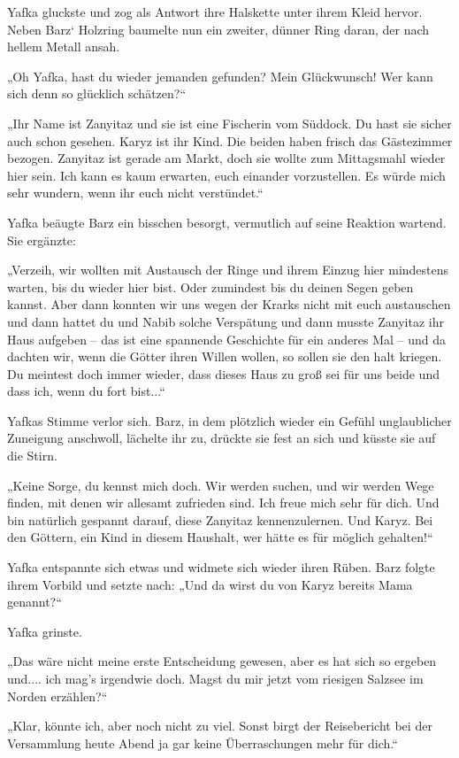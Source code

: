 Yafka gluckste und zog als Antwort ihre Halskette unter ihrem Kleid hervor. Neben Barz‘ Holzring baumelte nun ein zweiter, dünner Ring daran, der nach hellem Metall ansah.

„Oh Yafka, hast du wieder jemanden gefunden? Mein Glückwunsch! Wer kann sich denn so glücklich schätzen?“

„Ihr Name ist Zanyitaz und sie ist eine Fischerin vom Süddock. Du hast sie sicher auch schon gesehen. Karyz ist ihr Kind. Die beiden haben frisch das Gästezimmer bezogen. Zanyitaz ist gerade am Markt, doch sie wollte zum Mittagsmahl wieder hier sein. Ich kann es kaum erwarten, euch einander vorzustellen. Es würde mich sehr wundern, wenn ihr euch nicht verstündet.“

Yafka beäugte Barz ein bisschen besorgt, vermutlich auf seine Reaktion wartend. Sie ergänzte:

„Verzeih, wir wollten mit Austausch der Ringe und ihrem Einzug hier mindestens warten, bis du wieder hier bist. Oder zumindest bis du deinen Segen geben kannst. Aber dann konnten wir uns wegen der Krarks nicht mit euch austauschen und dann hattet du und Nabib solche Verspätung und dann musste Zanyitaz ihr Haus aufgeben – das ist eine spannende Geschichte für ein anderes Mal – und da dachten wir, wenn die Götter ihren Willen wollen, so sollen sie den halt kriegen. Du meintest doch immer wieder, dass dieses Haus zu groß sei für uns beide und dass ich, wenn du fort bist...“

Yafkas Stimme verlor sich. Barz, in dem plötzlich wieder ein Gefühl unglaublicher Zuneigung anschwoll, lächelte ihr zu, drückte sie fest an sich und küsste sie auf die Stirn.

„Keine Sorge, du kennst mich doch. Wir werden suchen, und wir werden Wege finden, mit denen wir allesamt zufrieden sind. Ich freue mich sehr für dich. Und bin natürlich gespannt darauf, diese Zanyitaz kennenzulernen. Und Karyz. Bei den Göttern, ein Kind in diesem Haushalt, wer hätte es für möglich gehalten!“

Yafka entspannte sich etwas und widmete sich wieder ihren Rüben. Barz folgte ihrem Vorbild und setzte nach: „Und da wirst du von Karyz bereits Mama genannt?“

Yafka grinste.

„Das wäre nicht meine erste Entscheidung gewesen, aber es hat sich so ergeben und.... ich mag’s irgendwie doch. Magst du mir jetzt vom riesigen Salzsee im Norden erzählen?“

„Klar, könnte ich, aber noch nicht zu viel. Sonst birgt der Reisebericht bei der Versammlung heute Abend ja gar keine Überraschungen mehr für dich.“

